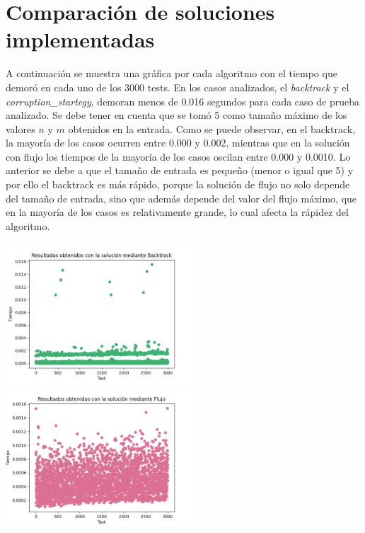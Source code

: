 \documentclass[10pt]{article} %
\begin{document}
	\section{Comparaci\'on de soluciones implementadas}          
	A continuaci\'on se muestra una gr\'afica por cada algoritmo con el tiempo que demor\'o en cada uno de los 3000 tests. En los casos analizados, el \textit{backtrack} y el \textit{corruption\_startegy}, demoran menos de 0.016 segundos para cada caso de prueba analizado. Se debe tener en cuenta que se tom\'o 5 como tama\~no m\'aximo de los valores $n$ y $m$ obtenidos en la entrada. Como se puede observar, en el backtrack, la mayor\'ia de los casos ocurren entre 0.000 y 0.002, mientras que en la soluci\'on con flujo los tiempos de la mayor\'ia de los casos oscilan entre 0.000 y 0.0010. Lo anterior se debe a que el tama\~no de entrada es peque\~no (menor o igual que 5) y por ello el backtrack es m\'as r\'apido, porque la soluci\'on de flujo no solo depende del tama\~no de entrada, sino que adem\'as depende del valor del flujo m\'aximo, que en la mayor\'ia de los casos es relativamente grande, lo cual afecta la r\'apidez del algoritmo.
	                                                             
	\begin{center}
		\includegraphics[width=7cm]{Backtrack_results.png}
		\includegraphics[width=7cm]{Flujo_results.png}
	\end{center}  
	
\end{document}
